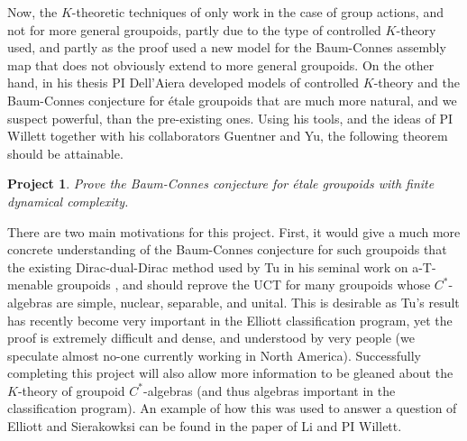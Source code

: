 \documentclass[11pt]{article}
\theoremstyle{plain}
\newtheorem{project}[theorem]{Project}
\theoremstyle{definition}
\newtheorem{definition}[theorem]{Definition}
\theoremstyle{remark}
\begin{document}


Now, the $K$-theoretic techniques of \cite{Guentner:2014bh} only work in the case of group actions, and not for more general groupoids, partly due to the type of controlled $K$-theory used, and partly as the proof used a new model for the Baum-Connes assembly map that does not obviously extend to more general groupoids.  On the other hand, in his thesis PI Dell'Aiera developed models of controlled $K$-theory and the Baum-Connes conjecture for \'{e}tale groupoids that are much more natural, and we suspect powerful, than the pre-existing ones.  Using his tools, and the ideas of PI Willett together with his collaborators Guentner and Yu, the following theorem should be attainable.

\begin{project}
Prove the Baum-Connes conjecture for \'{e}tale groupoids with finite dynamical complexity.
\end{project} 

There are two main motivations for this project.  First, it would give a much more concrete understanding of the Baum-Connes conjecture for such groupoids that the existing Dirac-dual-Dirac method used by Tu in his seminal work on a-T-menable groupoids \cite{Tu:1999bq}, and should reprove the UCT for many  groupoids whose $C^*$-algebras are simple, nuclear, separable, and unital.  This is desirable as Tu's result has recently become very important in the Elliott classification program, yet the proof is extremely difficult and dense, and understood by very people (we speculate almost no-one currently working in North America). Successfully completing this project will also allow more information to be gleaned about the $K$-theory of groupoid $C^*$-algebras (and thus algebras important in the classification program).  An example of how this was used to answer a question of Elliott and Sierakowksi can be found in the paper \cite{Li:2017ac} of Li and PI Willett.
\end{document}
